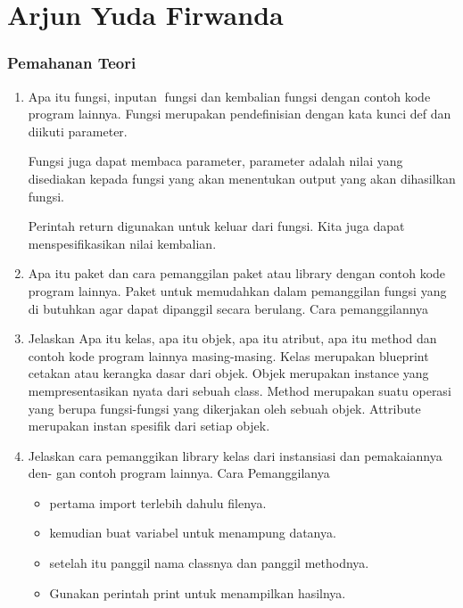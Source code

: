 
\section{Arjun Yuda Firwanda}
\subsubsection{Pemahanan Teori}
\begin{enumerate}
    \item Apa itu fungsi, inputan fungsi dan kembalian fungsi dengan contoh kode program
    lainnya.
    Fungsi merupakan pendefinisian dengan kata kunci def dan diikuti parameter.
    

    Fungsi juga dapat membaca parameter, parameter adalah nilai yang disediakan kepada fungsi yang akan menentukan output yang akan dihasilkan fungsi.
    

    Perintah return digunakan untuk keluar dari fungsi. Kita juga dapat menspesifikasikan nilai kembalian.
    

    \item Apa itu paket dan cara pemanggilan paket atau library dengan contoh kode
    program lainnya.
    Paket untuk memudahkan dalam pemanggilan fungsi yang di butuhkan agar dapat dipanggil secara berulang.
    Cara pemanggilannya
    

    \item Jelaskan Apa itu kelas, apa itu objek, apa itu atribut, apa itu method dan
    contoh kode program lainnya masing-masing.
    Kelas merupakan blueprint cetakan atau kerangka dasar dari objek.
    Objek merupakan instance yang mempresentasikan nyata dari sebuah class.
    Method merupakan suatu operasi yang berupa fungsi-fungsi yang dikerjakan oleh sebuah objek.
    Attribute merupakan instan spesifik dari setiap objek.
    

    \item Jelaskan cara pemanggikan library kelas dari instansiasi dan pemakaiannya den-
    gan contoh program lainnya.
    Cara Pemanggilanya 
    \begin{itemize}
        \item pertama import terlebih dahulu filenya.
        \item kemudian buat variabel untuk menampung datanya.
        \item setelah itu panggil nama classnya dan panggil methodnya.
        \item Gunakan perintah print untuk menampilkan hasilnya.


\end{itemize}
\end{enumerate}
